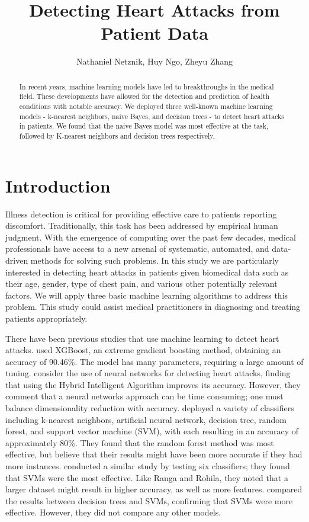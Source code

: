 \documentclass{article}
\title{Detecting Heart Attacks from Patient Data}
\author{Nathaniel Netznik, Huy Ngo, Zheyu Zhang}
\affil{CMPSC 445 - Applied Machine Learning in Data Science}
\date{}
\begin{document}
\maketitle
\begin{abstract}
In recent years, machine learning models have led to breakthroughs in the medical field. These developments have allowed for the detection and prediction of health conditions with notable accuracy. We deployed three well-known machine learning models - k-nearest neighbors, naive Bayes, and decision trees - to detect heart attacks in patients. We found that the naive Bayes model was most effective at the task, followed by K-nearest neighbors and decision trees respectively.
\end{abstract}
\section{Introduction}


Illness detection is critical for providing effective care to patients reporting discomfort. Traditionally, this task has been addressed by empirical human judgment. With the emergence of computing over the past few decades, medical professionals have access to a new arsenal of systematic, automated, and data-driven methods for solving such problems. In this study we are particularly interested in detecting heart attacks in patients given biomedical data such as their age, gender, type of chest pain, and various other potentially relevant factors. We will apply three basic machine learning algorithms to address this problem. This study could assist medical practitioners in diagnosing and treating patients appropriately.


There have been previous studies that use machine learning to detect heart attacks. \cite{karthikeyan} used XGBoost, an extreme gradient boosting method, obtaining an accuracy of 90.46\%. The model has many parameters, requiring a large amount of tuning. \cite{chitra} consider the use of neural networks for detecting heart attacks, finding that using the Hybrid Intelligent Algorithm improves its accuracy. However, they comment that a neural networks approach can be time consuming; one must balance dimensionality reduction with accuracy. \cite{ranga} deployed a variety of classifiers including k-nearest neighbors, artificial neural network, decision tree, random forest, and support vector machine (SVM), with each resulting in an accuracy of approximately 80\%. They found that the random forest method was most effective, but believe that their results might have been more accurate if they had more instances. \cite{ware} conducted a similar study by testing six classifiers; they found that SVMs were the most effective. Like Ranga and Rohila, they noted that a larger dataset might result in higher accuracy, as well as more features. \cite{gawale} compared the results  between decision trees and SVMs, confirming that SVMs were more effective. However, they did not compare any other models.
\end{document}
